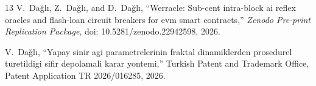 \documentclass[10pt,twocolumn]{article}
\begin{document}
\begin{thebibliography}{13}
V.~Da{\u{g}}l{\i}, Z.~Da{\u{g}}l{\i}, and D.~Da{\u{g}}l{\i}, ``Werracle:
  Sub-cent intra-block ai reflex oracles and flash-loan circuit breakers for
  evm smart contracts,'' \emph{Zenodo Pre-print Replication Package}, doi:
  10.5281/zenodo.22942598, 2026.

V.~Da{\u{g}}l{\i}, ``Yapay sinir agi parametrelerinin fraktal dinamiklerden
  prosedurel turetildigi sifir depolamali karar yontemi,'' Turkish Patent and
  Trademark Office, Patent Application TR 2026/016285, 2026.

\end{thebibliography}
\end{document}
